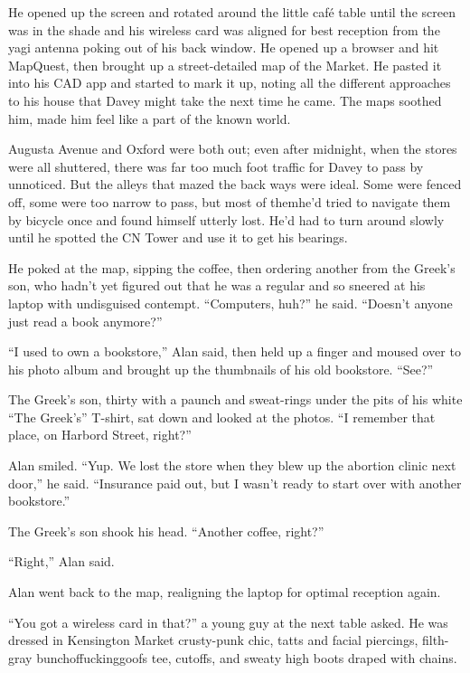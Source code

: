 He opened up the screen and rotated around the little caf\'{e} table
until the screen was in the shade and his wireless card was aligned
for best reception from the yagi antenna poking out of his back
window.  He opened up a browser and hit MapQuest, then brought up a
street-detailed map of the Market.  He pasted it into his CAD app and
started to mark it up, noting all the different approaches to his
house that Davey might take the next time he came.  The maps soothed
him, made him feel like a part of the known world.

Augusta Avenue and Oxford were both out; even after midnight, when the
stores were all shuttered, there was far too much foot traffic for
Davey to pass by unnoticed.  But the alleys that mazed the back ways
were ideal.  Some were fenced off, some were too narrow to pass, but
most of them\dash{}he'd tried to navigate them by bicycle once and found
himself utterly lost.  He'd had to turn around slowly until he spotted
the CN Tower and use it to get his bearings.

He poked at the map, sipping the coffee, then ordering another from
the Greek's son, who hadn't yet figured out that he was a regular and
so sneered at his laptop with undisguised contempt.  ``Computers,
huh?'' he said.  ``Doesn't anyone just read a book anymore?''

``I used to own a bookstore,'' Alan said, then held up a finger and
moused over to his photo album and brought up the thumbnails of his
old bookstore.  ``See?''

The Greek's son, thirty with a paunch and sweat-rings under the pits
of his white ``The Greek's'' T-shirt, sat down and looked at the
photos.  ``I remember that place, on Harbord Street, right?''

Alan smiled.  ``Yup.  We lost the store when they blew up the abortion
clinic next door,'' he said.  ``Insurance paid out, but I wasn't ready
to start over with another bookstore.''

The Greek's son shook his head.  ``Another coffee, right?''

``Right,'' Alan said.

Alan went back to the map, realigning the laptop for optimal reception
again.

``You got a wireless card in that?'' a young guy at the next table
asked.  He was dressed in Kensington Market crusty-punk chic, tatts
and facial piercings, filth-gray bunchoffuckinggoofs tee, cutoffs, and
sweaty high boots draped with chains.

